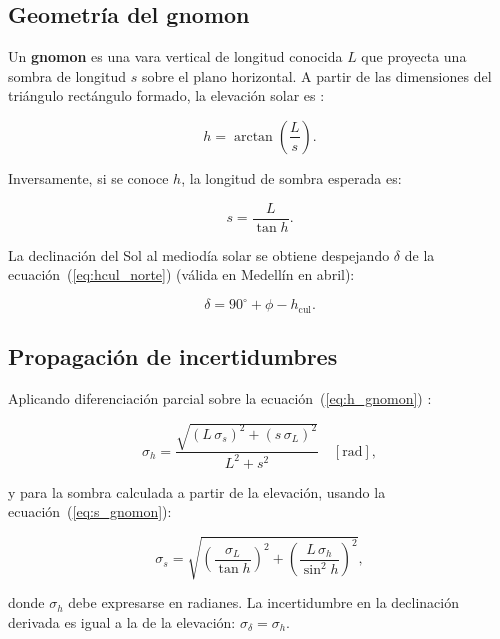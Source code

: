 \subsection{Geometría del gnomon}

Un \textbf{gnomon} es una vara vertical de longitud conocida $L$ que proyecta una
sombra de longitud $s$ sobre el plano horizontal.
A partir de las dimensiones del triángulo rectángulo formado, la elevación solar es
\citep{PortillaBarbosa2009}:

\begin{equation}
  h = \arctan\!\left(\frac{L}{s}\right).
  \label{eq:h_gnomon}
\end{equation}

Inversamente, si se conoce $h$, la longitud de sombra esperada es:

\begin{equation}
  s = \frac{L}{\tan h}.
  \label{eq:s_gnomon}
\end{equation}

La declinación del Sol al mediodía solar se obtiene despejando $\delta$ de la
ecuación~(\ref{eq:hcul_norte}) (válida en Medellín en abril):

\begin{equation}
  \boxed{\delta = 90^\circ + \phi - h_\text{cul}}.
  \label{eq:delta_gnomon}
\end{equation}

\subsection{Propagación de incertidumbres}

Aplicando diferenciación parcial sobre la ecuación~(\ref{eq:h_gnomon})
\citep{Baird1991}:

\begin{equation}
  \sigma_h = \frac{\sqrt{(L\,\sigma_s)^2 + (s\,\sigma_L)^2}}{L^2 + s^2}
  \quad [\text{rad}],
  \label{eq:sigma_h}
\end{equation}

y para la sombra calculada a partir de la elevación, usando la
ecuación~(\ref{eq:s_gnomon}):

\begin{equation}
  \sigma_s = \sqrt{\left(\frac{\sigma_L}{\tan h}\right)^2
  + \left(\frac{L\,\sigma_h}{\sin^2 h}\right)^2},
  \label{eq:sigma_s}
\end{equation}

donde $\sigma_h$ debe expresarse en radianes.
La incertidumbre en la declinación derivada es igual a la de la elevación:
$\sigma_\delta = \sigma_h$.

